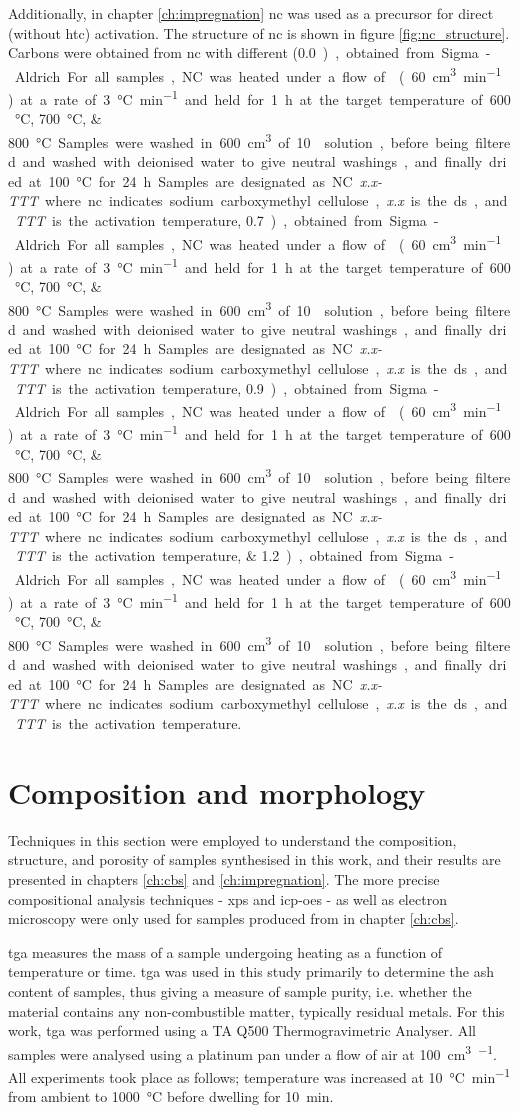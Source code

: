 Additionally, in chapter \ref{ch:impregnation} \acrfull{nc} was used as a precursor for direct (without \gls{htc}) activation. The structure of \acrshort{nc} is shown in figure \ref{fig:nc_structure}. Carbons were obtained from \acrshort{nc} with different  (\qtylist[list-final-separator={ or }, list-units=single]{0.0;0.7;0.9;1.2}), obtained from Sigma-Aldrich. For all samples, NC was heated under a flow of  (\qty{60}{\cm\cubed\per\minute}) at a rate of \qty{3}{\degreeCelsius\per\minute} and held for \qty{1}{\hour} at the target temperature of \qtylist[list-final-separator={ or }, list-units=single]{600;700;800}{\degreeCelsius}. Samples were washed in \qty{600}{\cm\cubed} of \qty{10}{\volpercent}  solution, before being filtered and washed with deionised water to give neutral washings, and finally dried at \qty{100}{\degreeCelsius} for \qty{24}{\hour}. Samples are designated as NC\textit{x.x-TTT} where \acrshort{nc} indicates sodium carboxymethyl cellulose, \textit{x.x} is the \acrshort{ds}, and \textit{TTT} is the activation temperature. 

\section{Composition and morphology}\label{s:composition_morphology}
Techniques in this section were employed to understand the composition, structure, and porosity of samples synthesised in this work, and their results are presented in chapters \ref{ch:cbs} and \ref{ch:impregnation}. The more precise compositional analysis techniques - \acrfull{xps} and \acrfull{icp-oes} - as well as electron microscopy were only used for samples produced from  in chapter \ref{ch:cbs}.

\acrfull{tga} measures the mass of a sample undergoing heating as a function of temperature or time.\citep{coats1963thermogravimetric} \acrshort{tga} was used in this study primarily to determine the \gls{ash content} of samples, thus giving a measure of sample purity,\citep{mcnaught1997compendium} i.e. whether the material contains any non-combustible matter, typically residual metals. For this work, \acrshort{tga} was performed using a TA Q500 Thermogravimetric Analyser. All samples were analysed using a platinum pan under a flow of air at \qty{100}{\cm\cubed\per\min}. All experiments took place as follows; temperature was increased at \qty{10}{\degreeCelsius\per\minute} from ambient to \qty{1000}{\degreeCelsius} before dwelling for \qty{10}{\minute}.


